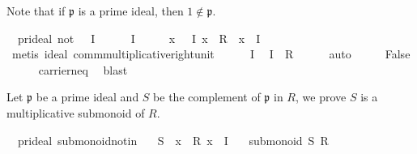 \documentclass[12pt]{scrartcl}
\begin{document}
Note that if $\mathfrak{p}$ is a prime ideal, then $1 \notin \mathfrak{p}$.


\begin{isabelle}
\isamarkupfalse%
\ {\isacharparenleft}{\kern0pt}\ pr{\isacharunderscore}{\kern0pt}ideal{\isacharparenright}{\kern0pt}\ not{\isacharunderscore}{\kern0pt}{}{\isacharcolon}{\kern0pt}\ {\isachardoublequoteopen}{\isasymone}\ {\isasymnotin}\ I{\isachardoublequoteclose}\isanewline
{}\isamarkupfalse%
\isanewline
\ \ \isamarkupfalse%
\ {\isachardoublequoteopen}{\isasymone}\ {\isasymin}\ I{\isachardoublequoteclose}\isanewline
\ \ \isamarkupfalse%
\ \isamarkupfalse%
\ {\isachardoublequoteopen}{\isasymAnd}x{\isachardot}{\kern0pt}\ {\isasymlbrakk}{\isasymone}\ {\isasymin}\ I{\isacharsemicolon}{\kern0pt}\ x\ {\isasymin}\ R{\isasymrbrakk}\ {\isasymLongrightarrow}\ x\ {\isasymin}\ I{\isachardoublequoteclose}\isanewline
\ \ \ \ \isamarkupfalse%
\ {\isacharparenleft}{\kern0pt}metis\ ideal{\isacharparenleft}{\kern0pt}{}{\isacharparenright}{\kern0pt}\ comm{\isachardot}{\kern0pt}multiplicative{\isachardot}{\kern0pt}right{\isacharunderscore}{\kern0pt}unit{\isacharparenright}{\kern0pt}\isanewline
\ \ \isamarkupfalse%
\ {\isacartoucheopen}{\isasymone}\ {\isasymin}\ I{\isacartoucheclose}\ \isamarkupfalse%
\ {\isachardoublequoteopen}I\ {\isacharequal}{\kern0pt}\ R{\isachardoublequoteclose}\isanewline
\ \ \ \ \isamarkupfalse%
\ auto\isanewline
\ \ \isamarkupfalse%
\ \isamarkupfalse%
\ False\isanewline
\ \ \ \ \isamarkupfalse%
\ carrier{\isacharunderscore}{\kern0pt}neq\ \isamarkupfalse%
\ blast\isanewline
{}
\end{isabelle}

Let $\mathfrak{p}$ be a prime ideal and $S$ be the complement of $\mathfrak{p}$ in $R$,  we prove $S$ is a multiplicative submonoid of $R$.

\begin{isabelle}
\isamarkupfalse%
\ {\isacharparenleft}{\kern0pt}\ pr{\isacharunderscore}{\kern0pt}ideal{\isacharparenright}{\kern0pt}\ submonoid{\isacharunderscore}{\kern0pt}notin{\isacharcolon}{\kern0pt}\isanewline
\ \ \ {\isachardoublequoteopen}S\ {\isacharequal}{\kern0pt}\ {\isacharbraceleft}{\kern0pt}x\ {\isasymin}\ R{\isachardot}{\kern0pt}\ x\ {\isasymnotin}\ I{\isacharbraceright}{\kern0pt}{\isachardoublequoteclose}\isanewline
\ \ \ {\isachardoublequoteopen}submonoid\ S\ R\ {\isacharparenleft}{\kern0pt}{\isasymcdot}{\isacharparenright}{\kern0pt}\ {\isasymone}{\isachardoublequoteclose}
\end{isabelle}
\end{document}
